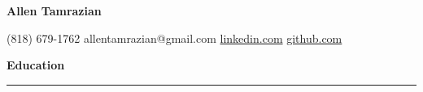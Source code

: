 \documentclass[11pt]{article}
\begin{document}
\begin{center}
{\large{\textbf{\huge{Allen Tamrazian}}}}


\textnormal{(818) 679-1762} {\textbar}
allentamrazian@gmail.com {\textbar}
\href{https://www.linkedin.com/in/allen-tamrazian-345406225/}{linkedin.com} {\textbar}
\href{https://github.com/AllenTamrazian}{github.com}

\end{center}
\textbf{Education}
\vspace{-10pt}
\newline
\rule{\textwidth}{0.4pt}
\end{document}
